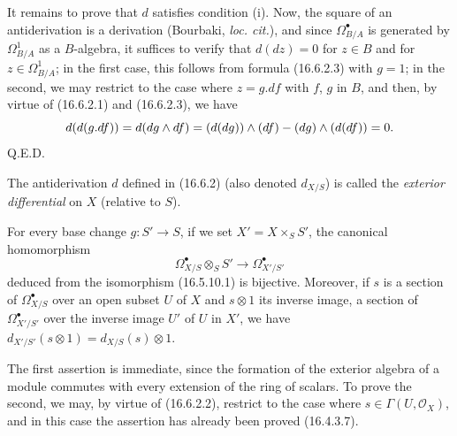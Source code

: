 It remains to prove that $d$ satisfies condition (i). Now, the square of an
antiderivation is a derivation (Bourbaki, \emph{loc. cit.}), and since
$\Omega_{B/A}^{\bullet}$ is generated by $\Omega_{B/A}^1$ as a
$B$-algebra, it suffices to verify that $d(dz)=0$ for $z\in B$ and for
$z\in\Omega_{B/A}^1$; in the first case, this follows from formula
(16.6.2.3) with $g=1$; in the second, we may restrict to the case where $z=g.df$
with $f$, $g$ in $B$, and then, by virtue of (16.6.2.1) and (16.6.2.3), we have
\[
  d(d(g.df))=d(dg\wedge df)
  =(d(dg))\wedge(df)-(dg)\wedge(d(df))=0.
\]
\hfill Q.E.D.

\begin{definition}[16.6.3]\label{IV.16.6.3}
The antiderivation $d$ defined in \textup{(16.6.2)} (also denoted $d_{X/S}$) is
called the \emph{exterior differential} on $X$ (relative to $S$).
\end{definition}

\begin{proposition}[16.6.4]
\label{IV.16.6.4}
For every base change $g:S'\to S$, if we set
$X'=X\times_S S'$, the canonical homomorphism
\[
  \varOmega_{X/S}^{\bullet}\otimes_S S'
  \longrightarrow\varOmega_{X'/S'}^{\bullet}
  \tag{16.6.4.1}
  \label{IV.16.6.4.1}
\]
deduced from the isomorphism \textup{(16.5.10.1)} is bijective. Moreover, if $s$ is a
section of $\varOmega_{X/S}^{\bullet}$ over an open subset $U$ of $X$ and
$s\otimes1$ its inverse image, a section of $\varOmega_{X'/S'}^{\bullet}$
over the inverse image $U'$ of $U$ in $X'$, we have
$d_{X'/S'}(s\otimes1)=d_{X/S}(s)\otimes1$.
\end{proposition}

The first assertion is immediate, since the formation of the exterior algebra
of a module commutes with every extension of the ring of scalars. To
prove the second, we may, by virtue of (16.6.2.2), restrict to the case where
$s\in\Gamma(U,\mathcal{O}_X)$, and in this case the assertion has already been
proved (16.4.3.7).

